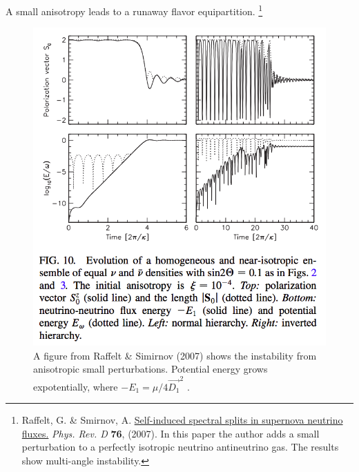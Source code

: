 \documentclass[letterpaper,12pt,english]{sphinxmanual}
\begin{document}
A small anisotropy leads to a runaway flavor equipartition. \footnote{
Raffelt, G. \& Smirnov, A. \href{http://journals.aps.org/prd/abstract/10.1103/PhysRevD.75.083002}{Self-induced spectral splits in supernova neutrino fluxes.} \emph{Phys. Rev. D} \textbf{76}, (2007). In this paper the author adds a small perturbation to a perfectly isotropic neutrino antineutrino gas. The results show multi-angle instability.
}
\begin{figure}[htbp]
\centering
\capstart

\includegraphics{multiangleInstability.png}
\caption{A figure from Raffelt \& Simirnov (2007) shows the instability from anisotropic small perturbations. Potential energy grows expotentially, where \(-E_1 = \mu/4 \vec{D_1}^2\) .}\end{figure}
\end{document}
